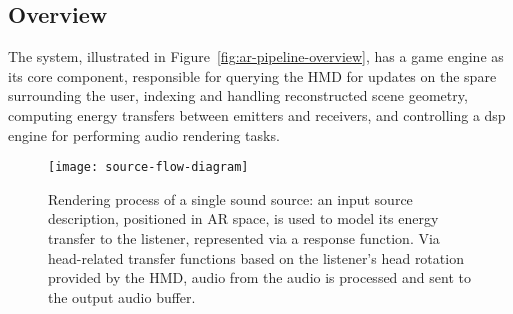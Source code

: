 \subsection{Overview}
The system, illustrated in Figure~\ref{fig:ar-pipeline-overview}, has a game engine as its core component, responsible for querying the HMD for updates on the spare surrounding the user, indexing and handling reconstructed scene geometry, computing energy transfers between emitters and receivers, and controlling a \acrshort{dsp} engine for performing audio rendering tasks.
\begin{figure}[htb]
    \centering
    \texttt{[image: source-flow-diagram]}
    \caption[Flow of signal from a sound-emitting entity to rendered audio]{Rendering process of a single sound source: an input source description, positioned in AR space, is used to model its energy transfer to the listener, represented via a response function. Via head-related transfer functions based on the listener's head rotation provided by the HMD, audio from the audio is processed and sent to the output audio buffer.}
\label{fig:source-flow-diagram}
\end{figure}

